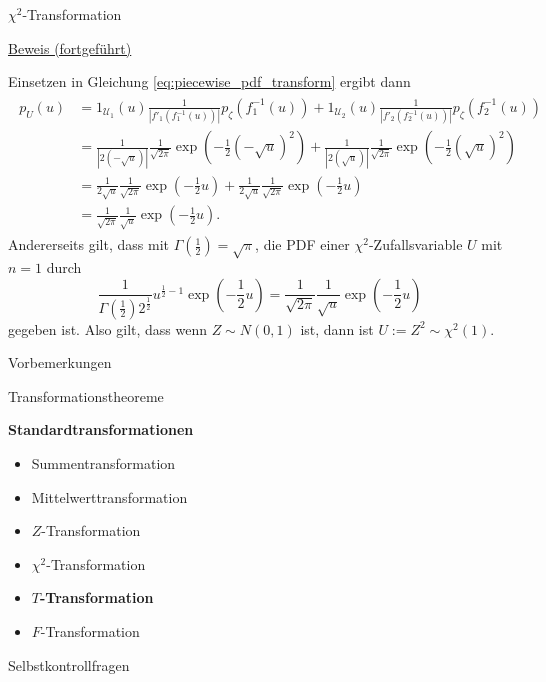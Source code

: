 \documentclass[
  8pt,
  ignorenonframetext,
]{beamer}
\providecommand{\tightlist}{%
  \setlength{\itemsep}{0pt}\setlength{\parskip}{0pt}}
\begin{document}
\begin{frame}{\(\chi^2\)-Transformation}
\protect\hypertarget{chi2-transformation-5}{}
\footnotesize

\underline{Beweis (fortgeführt)} \vspace{1mm}

Einsetzen in Gleichung \eqref{eq:piecewise_pdf_transform} ergibt dann
\begin{align}
\begin{split}
p_U(u)
& = 1_{\mathcal{U}_1}(u) \frac{1}{|f'_1(f_1^{-1}(u))|}p_\zeta\left(f_1^{-1} (u)\right)
  + 1_{\mathcal{U}_2}(u) \frac{1}{|f'_2(f_2^{-1}(u))|}p_\zeta\left(f_2^{-1} (u)\right) \\
& = \frac{1}{|2(-\sqrt{u})|}\frac{1}{\sqrt{2\pi}}\exp\left(-\frac{1}{2}(-\sqrt{u})^2\right)
  + \frac{1}{|2( \sqrt{u})|}\frac{1}{\sqrt{2\pi}}\exp\left(-\frac{1}{2}( \sqrt{u})^2\right) \\
& = \frac{1}{2\sqrt{u}}\frac{1}{\sqrt{2\pi}}\exp\left(-\frac{1}{2}u\right)
  + \frac{1}{2\sqrt{u}}\frac{1}{\sqrt{2\pi}}\exp\left(-\frac{1}{2}u\right)\\
& = \frac{1}{\sqrt{2\pi}}\frac{1}{\sqrt{u}}\exp\left(-\frac{1}{2}u\right).
\end{split}
\end{align} Andererseits gilt, dass mit
\(\Gamma\left(\frac{1}{2}\right) = \sqrt{\pi}\), die PDF einer
\(\chi^2\)-Zufallsvariable \(U\) mit \(n = 1\) durch \begin{equation}
\frac{1}{\Gamma\left(\frac{1}{2}\right)2^{\frac{1}{2}}} u^{\frac{1}{2}-1}\exp\left(-\frac{1}{2}u\right)
= \frac{1}{\sqrt{2\pi}}\frac{1}{\sqrt{u}}\exp\left(-\frac{1}{2}u\right)
\end{equation} gegeben ist. Also gilt, dass wenn \(Z \sim N(0,1)\) ist,
dann ist \(U := Z^2 \sim \chi^2(1)\).
\end{frame}

\begin{frame}{}
\protect\hypertarget{section-10}{}
\large

Vorbemerkungen

Transformationstheoreme

\textbf{Standardtransformationen}

\normalsize

\begin{itemize}
\tightlist
\item
  Summentransformation
\item
  Mittelwerttransformation
\item
  \(Z\)-Transformation
\item
  \(\chi^2\)-Transformation
\item
  \textbf{\(T\)-Transformation}
\item
  \(F\)-Transformation
\end{itemize}

\large

Selbstkontrollfragen
\end{frame}
\end{document}
